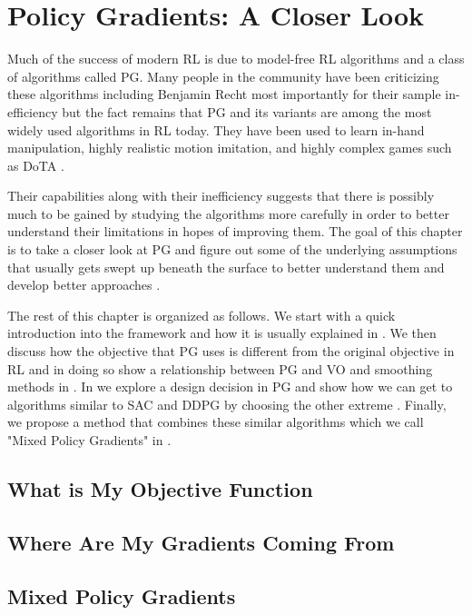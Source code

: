 \chapter{Policy Gradients: A Closer Look}
\label{ch:mixedpg}

Much of the success of modern \ac{RL} is due to model-free \ac{RL} algorithms   and a class of algorithms called \ac{PG}. Many people in the community have been criticizing these algorithms including Benjamin Recht  most importantly for their sample in-efficiency   but the fact remains that \ac{PG} and its variants are among the most widely used algorithms in \ac{RL} today. They have been used to learn in-hand manipulation, highly realistic motion imitation, and highly complex games such as DoTA  .

Their capabilities along with their inefficiency suggests that there is possibly much to be gained by studying the algorithms more carefully in order to better understand their limitations in hopes of improving them. The goal of this chapter is to take a closer look at \ac{PG} and figure out some of the underlying assumptions that usually gets swept up beneath the surface to better understand them and develop better approaches .

The rest of this chapter is organized as follows. We start with a quick introduction into the framework and how it is usually explained in . We then discuss how the objective that \ac{PG} uses is different from the original objective in \ac{RL} and in doing so show a relationship between \ac{PG} and \ac{VO}  and smoothing methods in . In  we explore a design decision in \ac{PG} and show how we can get to algorithms similar to \ac{SAC} and \ac{DDPG} by choosing the other extreme . Finally, we propose a method that combines these similar algorithms which we call "Mixed Policy Gradients" in .

\section{What is My Objective Function}
\label{sec:pg_objective}

\section{Where Are My Gradients Coming From}
\label{sec:pg_conv}

\section{Mixed Policy Gradients}
\label{sec:pg_mixed}